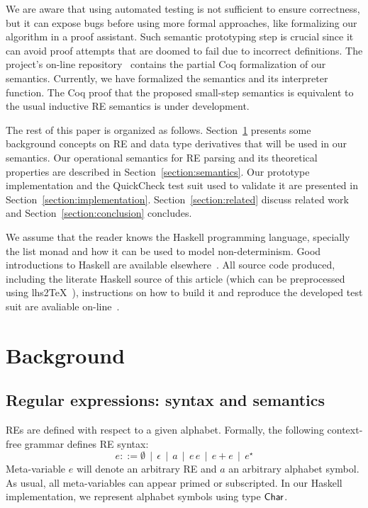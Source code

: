 \documentclass[sigplan]{acmart}
\theoremstyle{definition}
\newcommand{\D}[1]{\blue{\mathsf{#1}}}
\begin{document}
We are aware that using automated testing is not sufficient to ensure correctness, but it can expose bugs before using more formal approaches,
like formalizing our algorithm in a proof assistant. Such semantic prototyping step is crucial since it can avoid proof attempts that are
doomed to fail due to incorrect definitions. The project's on-line repository~\cite{regexvm-rep} contains the partial Coq formalization of
our semantics. Currently, we have formalized the semantics and its interpreter function. The Coq proof that the proposed small-step semantics
is equivalent to the usual inductive RE semantics is under development.

The rest of this paper is organized as follows. Section~\ref{section:background} presents some background concepts on RE and
data type derivatives that will be used in our semantics. Our operational semantics for RE parsing and its theoretical properties
are described in Section~\ref{section:semantics}. Our prototype implementation and the QuickCheck test suit used to validate
it are presented in Section~\ref{section:implementation}. Section~\ref{section:related} discuss related work and
Section~\ref{section:conclusion} concludes.

We assume that the reader knows the Haskell programming language, specially the list monad and how it can be used
to model non-determinism.  Good introductions to Haskell are available elsewhere~\cite{Lipovaca2011}.
All source code produced, including the literate Haskell source of this
article (which can be preprocessed using lhs2\TeX~\cite{Loh2005}), instructions on how to build it and reproduce the developed
test suit are avaliable on-line~\cite{regexvm-rep}.

\section{Background}\label{section:background}

\subsection{Regular expressions: syntax and semantics}

REs are defined with respect to a given alphabet. Formally, the following context-free
grammar defines RE syntax:
\[
e ::= \emptyset\,\mid\,\epsilon\,\mid\,a\,\mid\,e\,e\,\mid\,e+e\,\mid\,e^{\star}
\]
Meta-variable $e$ will denote an arbitrary RE and $a$ an
arbitrary alphabet symbol. As usual, all meta-variables can appear primed or subscripted.
In our Haskell implementation, we represent alphabet symbols using type \ensuremath{\D{Char}}.
\end{document}
